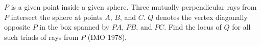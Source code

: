 $P$ is a given point inside a given sphere. Three mutually perpendicular rays from $P$ intersect the sphere at points $A$, $B$, and $C$. $Q$ denotes the vertex diagonally opposite $P$ in the box spanned by $PA$, $PB$, and $PC$. Find the locus of $Q$ for all such triads of rays from $P$ (IMO 1978).
